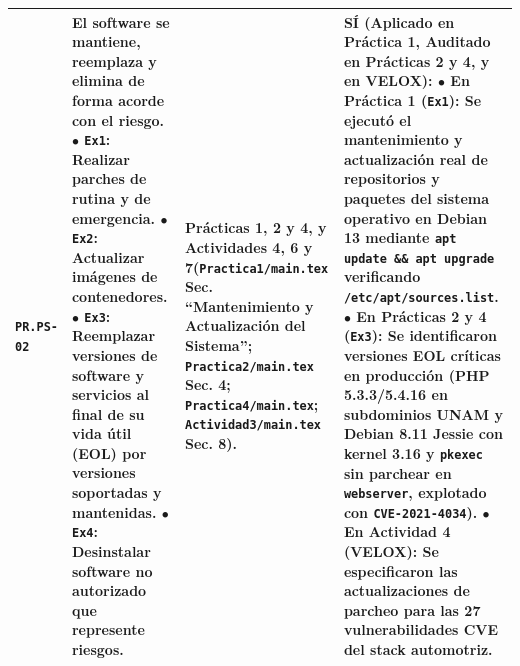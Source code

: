 \documentclass[letterpaper,11pt]{article}
\begin{document}
\begin{longtable}{|C{1.5cm}|L{5.3cm}|L{4.3cm}|L{5.8cm}|}
\texttt{PR.PS-02} &
\textbf{El software se mantiene, reemplaza y elimina de forma acorde con el riesgo.}\newline
$\bullet$ \texttt{Ex1}: \textbf{Realizar parches de rutina y de emergencia}.\newline
$\bullet$ \texttt{Ex2}: Actualizar imágenes de contenedores.\newline
$\bullet$ \texttt{Ex3}: \textbf{Reemplazar versiones de software y servicios al final de su vida útil (EOL) por versiones soportadas y mantenidas}.\newline
$\bullet$ \texttt{Ex4}: Desinstalar software no autorizado que represente riesgos. &
\textbf{Prácticas 1, 2 y 4, y Actividades 4, 6 y 7}\newline (\texttt{Practica1/main.tex} Sec. ``Mantenimiento y Actualización del Sistema''; \texttt{Practica2/main.tex} Sec. 4; \texttt{Practica4/main.tex}; \texttt{Actividad3/main.tex} Sec. 8). &
\textbf{SÍ (Aplicado en Práctica 1, Auditado en Prácticas 2 y 4, y en VELOX):}\newline
$\bullet$ \textbf{En Práctica 1 (\texttt{Ex1}):} Se ejecutó el mantenimiento y actualización real de repositorios y paquetes del sistema operativo en Debian 13 mediante \texttt{apt update \&\& apt upgrade} verificando \texttt{/etc/apt/sources.list}.\newline
$\bullet$ \textbf{En Prácticas 2 y 4 (\texttt{Ex3}):} Se identificaron versiones EOL críticas en producción (PHP 5.3.3/5.4.16 en subdominios UNAM y Debian 8.11 Jessie con kernel 3.16 y \texttt{pkexec} sin parchear en \texttt{webserver}, explotado con \texttt{CVE-2021-4034}).\newline
$\bullet$ \textbf{En Actividad 4 (VELOX):} Se especificaron las actualizaciones de parcheo para las 27 vulnerabilidades CVE del stack automotriz. \\
\hline


\end{longtable}
\end{document}
